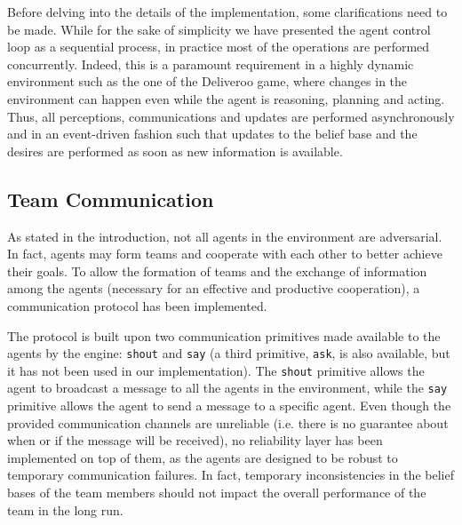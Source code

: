 Before delving into the details of the implementation, some clarifications need to be made. While for the sake of simplicity we have presented the agent control loop as a sequential process, in practice most of the operations are performed concurrently. Indeed, this is a paramount requirement in a highly dynamic environment such as the one of the Deliveroo game, where changes in the environment can happen even while the agent is reasoning, planning and acting. Thus, all perceptions, communications and updates are performed asynchronously and in an event-driven fashion such that updates to the belief base and the desires are performed as soon as new information is available.


\subsection{Team Communication}

As stated in the introduction, not all agents in the environment are adversarial. In fact, agents may form teams and cooperate with each other to better achieve their goals. To allow the formation of teams and the exchange of information among the agents (necessary for an effective and productive cooperation), a communication protocol has been implemented.

The protocol is built upon two communication primitives made available to the agents by the engine: \texttt{shout} and \texttt{say} (a third primitive, \texttt{ask}, is also available, but it has not been used in our implementation). The \texttt{shout} primitive allows the agent to broadcast a message to all the agents in the environment, while the \texttt{say} primitive allows the agent to send a message to a specific agent. Even though the provided communication channels are unreliable (i.e. there is no guarantee about when or if the message will be received), no reliability layer has been implemented on top of them, as the agents are designed to be robust to temporary communication failures. In fact, temporary inconsistencies in the belief bases of the team members should not impact the overall performance of the team in the long run.

